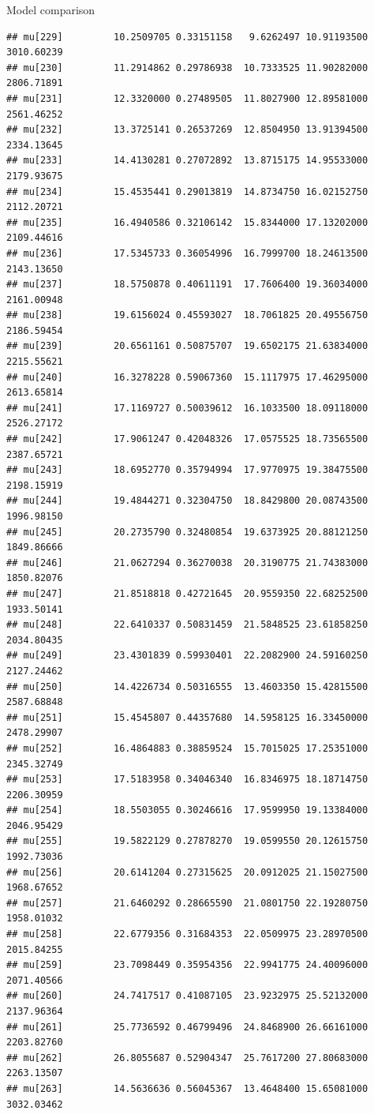 \documentclass[
  ignorenonframetext,
]{beamer}
\begin{document}
\begin{frame}[fragile]{Model comparison}
\begin{verbatim}
## mu[229]         10.2509705 0.33151158   9.6262497 10.91193500 3010.60239
## mu[230]         11.2914862 0.29786938  10.7333525 11.90282000 2806.71891
## mu[231]         12.3320000 0.27489505  11.8027900 12.89581000 2561.46252
## mu[232]         13.3725141 0.26537269  12.8504950 13.91394500 2334.13645
## mu[233]         14.4130281 0.27072892  13.8715175 14.95533000 2179.93675
## mu[234]         15.4535441 0.29013819  14.8734750 16.02152750 2112.20721
## mu[235]         16.4940586 0.32106142  15.8344000 17.13202000 2109.44616
## mu[236]         17.5345733 0.36054996  16.7999700 18.24613500 2143.13650
## mu[237]         18.5750878 0.40611191  17.7606400 19.36034000 2161.00948
## mu[238]         19.6156024 0.45593027  18.7061825 20.49556750 2186.59454
## mu[239]         20.6561161 0.50875707  19.6502175 21.63834000 2215.55621
## mu[240]         16.3278228 0.59067360  15.1117975 17.46295000 2613.65814
## mu[241]         17.1169727 0.50039612  16.1033500 18.09118000 2526.27172
## mu[242]         17.9061247 0.42048326  17.0575525 18.73565500 2387.65721
## mu[243]         18.6952770 0.35794994  17.9770975 19.38475500 2198.15919
## mu[244]         19.4844271 0.32304750  18.8429800 20.08743500 1996.98150
## mu[245]         20.2735790 0.32480854  19.6373925 20.88121250 1849.86666
## mu[246]         21.0627294 0.36270038  20.3190775 21.74383000 1850.82076
## mu[247]         21.8518818 0.42721645  20.9559350 22.68252500 1933.50141
## mu[248]         22.6410337 0.50831459  21.5848525 23.61858250 2034.80435
## mu[249]         23.4301839 0.59930401  22.2082900 24.59160250 2127.24462
## mu[250]         14.4226734 0.50316555  13.4603350 15.42815500 2587.68848
## mu[251]         15.4545807 0.44357680  14.5958125 16.33450000 2478.29907
## mu[252]         16.4864883 0.38859524  15.7015025 17.25351000 2345.32749
## mu[253]         17.5183958 0.34046340  16.8346975 18.18714750 2206.30959
## mu[254]         18.5503055 0.30246616  17.9599950 19.13384000 2046.95429
## mu[255]         19.5822129 0.27878270  19.0599550 20.12615750 1992.73036
## mu[256]         20.6141204 0.27315625  20.0912025 21.15027500 1968.67652
## mu[257]         21.6460292 0.28665590  21.0801750 22.19280750 1958.01032
## mu[258]         22.6779356 0.31684353  22.0509975 23.28970500 2015.84255
## mu[259]         23.7098449 0.35954356  22.9941775 24.40096000 2071.40566
## mu[260]         24.7417517 0.41087105  23.9232975 25.52132000 2137.96364
## mu[261]         25.7736592 0.46799496  24.8468900 26.66161000 2203.82760
## mu[262]         26.8055687 0.52904347  25.7617200 27.80683000 2263.13507
## mu[263]         14.5636636 0.56045367  13.4648400 15.65081000 3032.03462

\end{verbatim}
\end{frame}
\end{document}

